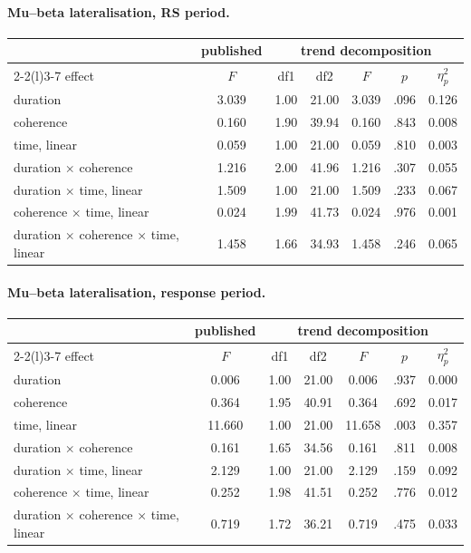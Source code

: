 \paragraph{Mu--beta lateralisation, RS period.}
\begin{center}\small
\begin{tabular}{lcccccc}
\toprule
 & \multicolumn{1}{c}{published} & \multicolumn{5}{c}{trend decomposition}\\
\cmidrule(lr){2-2}\cmidrule(l){3-7}
effect & $F$ & df1 & df2 & $F$ & $p$ & $\eta_p^2$\\
\midrule
duration & 3.039 & 1.00 & 21.00 & 3.039 & .096 & 0.126\\
coherence & 0.160 & 1.90 & 39.94 & 0.160 & .843 & 0.008\\
time, linear & 0.059 & 1.00 & 21.00 & 0.059 & .810 & 0.003\\
duration $\times$ coherence & 1.216 & 2.00 & 41.96 & 1.216 & .307 & 0.055\\
duration $\times$ time, linear & 1.509 & 1.00 & 21.00 & 1.509 & .233 & 0.067\\
coherence $\times$ time, linear & 0.024 & 1.99 & 41.73 & 0.024 & .976 & 0.001\\
duration $\times$ coherence $\times$ time, linear & 1.458 & 1.66 & 34.93 & 1.458 & .246 & 0.065\\
\bottomrule
\end{tabular}
\end{center}

\paragraph{Mu--beta lateralisation, response period.}
\begin{center}\small
\begin{tabular}{lcccccc}
\toprule
 & \multicolumn{1}{c}{published} & \multicolumn{5}{c}{trend decomposition}\\
\cmidrule(lr){2-2}\cmidrule(l){3-7}
effect & $F$ & df1 & df2 & $F$ & $p$ & $\eta_p^2$\\
\midrule
duration & 0.006 & 1.00 & 21.00 & 0.006 & .937 & 0.000\\
coherence & 0.364 & 1.95 & 40.91 & 0.364 & .692 & 0.017\\
time, linear & 11.660 & 1.00 & 21.00 & 11.658 & .003 & 0.357\\
duration $\times$ coherence & 0.161 & 1.65 & 34.56 & 0.161 & .811 & 0.008\\
duration $\times$ time, linear & 2.129 & 1.00 & 21.00 & 2.129 & .159 & 0.092\\
coherence $\times$ time, linear & 0.252 & 1.98 & 41.51 & 0.252 & .776 & 0.012\\
duration $\times$ coherence $\times$ time, linear & 0.719 & 1.72 & 36.21 & 0.719 & .475 & 0.033\\
\bottomrule
\end{tabular}
\end{center}


